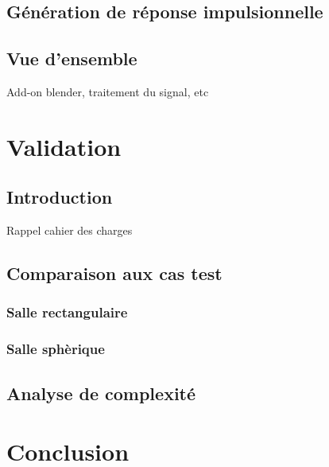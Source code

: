 \section{Génération de réponse impulsionnelle}
\section{Vue d'ensemble}
Add-on blender, traitement du signal, etc

\chapter{Validation}
	\minitoc
	\newpage
	\section{Introduction}
	Rappel cahier des charges
	\section{Comparaison aux cas test}
		\subsection{Salle rectangulaire}
		\subsection{Salle sphèrique}
	\section{Analyse de complexité}
	
\chapter*{Conclusion}
	\newpage
	
 
 

